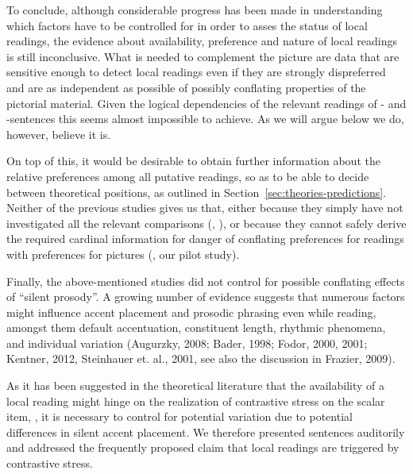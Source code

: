 \documentclass[fleqn,reqno,10pt,draft]{article}
\newcommand{\as}{\acro{as}}
\renewcommand{\es}{\acro{es}}
\begin{document}
To conclude, although considerable progress has been made in understanding which factors
have to be controlled for in order to asses the status of local readings, the evidence about availability,
preference and nature of local readings is still inconclusive. What is needed to complement
the picture are data that are sensitive enough to detect local readings even if they
are strongly dispreferred and are as independent as possible of possibly conflating properties
of the pictorial material. Given the logical dependencies of the
relevant readings of \as- and \es-sentences this seems almost
impossible to achieve. As we will argue below we do, however, believe it is.

On top of this, it would be desirable to obtain further information about
the relative preferences among all putative readings, so as to be able
to decide between theoretical positions, as outlined in
Section~\ref{sec:theories-predictions}. Neither of the previous
studies gives us that, either because they simply have not
investigated all the relevant comparisons
(\citet{GeurtsPouscoulous2009:Embedded-Implic},
\citet{CliftonDube2010:Embedded-Implic}), or because they cannot safely
derive the required cardinal information for danger of conflating
preferences for readings with preferences for pictures
(\citet{ChemlaSpector2010:Experimental-Ev}, our pilot study).

Finally, the above-mentioned studies did not control for possible 
conflating effects of ``silent prosody''. A growing number of evidence
suggests that numerous factors might influence accent placement and
prosodic phrasing even while reading, amongst them default accentuation,
constituent length, rhythmic phenomena, and individual variation
(Augurzky, 2008; Bader, 1998; Fodor, 2000, 2001; Kentner, 2012, Steinhauer et.
al., 2001, see also the discussion in Frazier, 2009).  

As it has been suggested in the theoretical literature that the availability
of a local reading might hinge on the realization of contrastive stress on the
scalar item, 
\citep[e.g.][]{Horn2006:The-Border-Wars,Geurts2009:Scalar-Implicat,Geurts2010:Quantity-Implic,Tielvan-Tiel2012:Embedded-Scalar}, it is necessary to
control for potential variation due to potential differences in silent accent placement.
We therefore presented sentences auditorily and addressed the frequently proposed claim 
that local readings are triggered by contrastive
stress.
\end{document}
